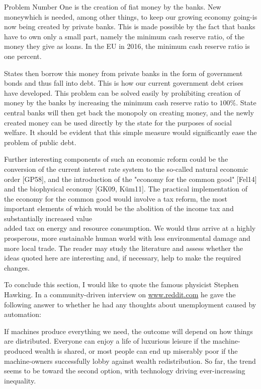 \documentclass[10pt]{article}
\begin{document}
Problem Number One is the creation of fiat money by the banks. New moneywhich is needed, among other things, to keep our growing economy going-is now being created by private banks. This is made possible by the fact that banks have to own only a small part, namely the minimum cash reserve ratio, of the money they give as loans. In the EU in 2016, the minimum cash reserve ratio is one percent.

States then borrow this money from private banks in the form of government bonds and thus fall into debt. This is how our current government debt crises have developed. This problem can be solved easily by prohibiting creation of money by the banks by increasing the minimum cash reserve ratio to $100 \%$. State central banks will then get back the monopoly on creating money, and the newly created money can be used directly by the state for the purposes of social welfare. It should be evident that this simple measure would significantly ease the problem of public debt.

Further interesting components of such an economic reform could be the conversion of the current interest rate system to the so-called natural economic order [GP58], and the introduction of the "economy for the common good" [Fel14] and the biophysical economy [GK09, Küm11]. The practical implementation of the economy for the common good would involve a tax reform, the most important elements of which would be the abolition of the income tax and substantially increased value\\
added tax on energy and resource consumption. We would thus arrive at a highly prosperous, more sustainable human world with less environmental damage and more local trade. The reader may study the literature and assess whether the ideas quoted here are interesting and, if necessary, help to make the required changes.

To conclude this section, I would like to quote the famous physicist Stephen Hawking. In a community-driven interview on \href{http://www.reddit.com}{www.reddit.com} he gave the following answer to whether he had any thoughts about unemployment caused by automation:

\begin{displayquote}
If machines produce everything we need, the outcome will depend on how things are distributed. Everyone can enjoy a life of luxurious leisure if the machine-produced wealth is shared, or most people can end up miserably poor if the machine-owners successfully lobby against wealth redistribution. So far, the trend seems to be toward the second option, with technology driving ever-increasing inequality.
\end{displayquote}
\end{document}
